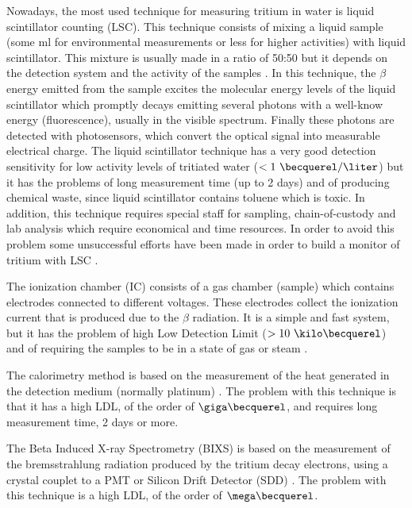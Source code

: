 Nowadays, the most used technique for measuring tritium in water is liquid scintillator counting (LSC). This technique consists of mixing a liquid sample (some ml for environmental measurements or less for higher activities) with liquid scintillator. This mixture is usually made in a ratio of 50:50 but it depends on the detection system and the activity of the samples \cite{LSCothers, HofstetterSeveral}. In this technique, the $\beta$ energy emitted from the sample excites the molecular energy levels of the liquid scintillator which promptly decays emitting several photons with a well-know energy (fluorescence), usually in the visible spectrum. Finally these photons are detected with photosensors, which convert the optical signal into measurable electrical charge. The liquid scintillator technique has a very good detection sensitivity for low activity levels of tritiated water ($<1~\becquerel/\liter$) \cite{0.6Bq_L} but it has the problems of long measurement time (up to 2 days) and of producing chemical waste, since liquid scintillator contains toluene which is toxic. In addition, this technique requires special staff for sampling, chain-of-custody and lab analysis which require economical and time resources. In order to avoid this problem some unsuccessful efforts have been made in order to build a monitor of tritium with LSC \cite{OnlineLSC}. 

The ionization chamber (IC) consists of a gas chamber (sample) which contains electrodes connected to different voltages. These electrodes collect the ionization current that is produced due to the $\beta$ radiation. It is a simple and fast system, but it has the problem of high Low Detection Limit ($> 10~\kilo\becquerel$) and of requiring the samples to be in a state of gas or steam \cite{IonizationChamber1, IonizationChamber2}.

The calorimetry method is based on the measurement of the heat generated in the detection medium (normally platinum) \cite{Calorimeter1, Calorimeter2}. The problem with this technique is that it has a high LDL, of the order of $\giga\becquerel$, and requires long measurement time, 2 days or more.

The Beta Induced X-ray Spectrometry (BIXS) is based on the measurement of the bremsstrahlung radiation produced by the tritium decay electrons, using a  crystal couplet to a PMT  \cite{XRays1, XRays2} or Silicon Drift Detector (SDD) \cite{Bremstrahlung}. The problem with this technique is a high LDL, of the order of $\mega\becquerel$.

